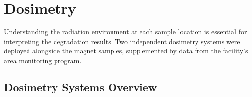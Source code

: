 \documentclass[11pt,letterpaper]{article}
\begin{document}
\section{Dosimetry}
\label{sec:dosimetry}

Understanding the radiation environment at each sample location is essential
for interpreting the degradation results. Two independent dosimetry systems
were deployed alongside the magnet samples, supplemented by data from the
facility's area monitoring program.

\subsection{Dosimetry Systems Overview}
\end{document}
